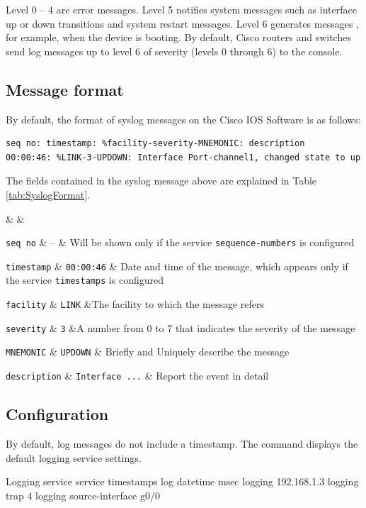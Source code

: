 Level 0 -- 4 are error messages. Level 5 notifies system messages such as interface up or down transitions and system restart messages. Level 6 generates messages , for example, when the device is booting. By default, Cisco routers and switches send log messages up to level 6 of severity (levels 0 through 6) to the console.

\subsection{Message format}

By default, the format of syslog messages on the Cisco IOS Software is as follows:

\begin{verbatim}
seq no: timestamp: %facility-severity-MNEMONIC: description
00:00:46: %LINK-3-UPDOWN: Interface Port-channel1, changed state to up
\end{verbatim}

The fields contained in the syslog message above are explained in Table \ref{tab:SyslogFormat}.

 &  &\w

\verb|seq no| & -- & Will be shown only if the service \verb|sequence-numbers| is configured \w

\verb|timestamp| & \verb|00:00:46| & Date and time of the message, which appears only if the service \verb|timestamps| is configured \w

\verb|facility| & \verb|LINK| &The facility to which the message refers \w

\verb|severity| &  \verb|3| &A number from 0 to 7  that indicates the severity of the message \w

\verb|MNEMONIC| & \verb|UPDOWN| & Briefly and Uniquely describe the message\w

\verb|description| & \verb|Interface ...| & Report the event in detail\w
\tableEnd

\subsection{Configuration}

By default, log messages do not include a timestamp. The  command displays the default logging service settings.\\

\begin{sexylisting}{Logging service}
service timestamps log datetime msec
logging 192.168.1.3
logging trap 4
logging source-interface g0/0
\end{sexylisting}

